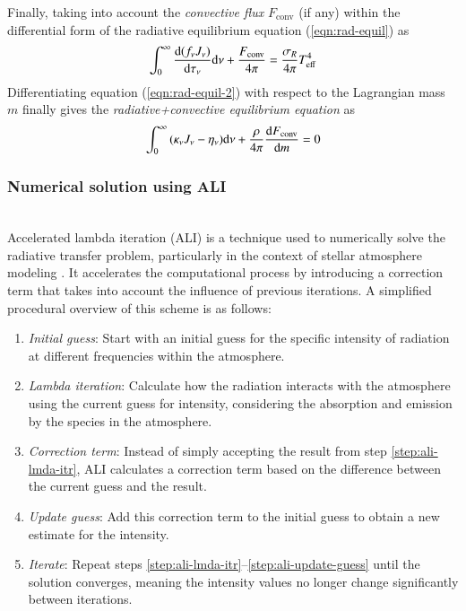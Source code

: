 		Finally, taking into account the \textit{convective flux} $F_\text{conv}$ (if any) within the differential form of the radiative equilibrium equation (\ref{eqn:rad-equil}) as
		\begin{align}
			\int_{0}^{\infty}{\dfrac{\mathrm{d} {(f_\nu J_\nu)}}{\mathrm{d} {\tau_\nu}}\mathrm{d} {\nu}}+\dfrac{F_\text{conv}}{4\pi}=\dfrac{\sigma_R}{4\pi}T_\text{eff}^4 \label{eqn:rad-equil-2}
		\end{align}
		Differentiating equation (\ref{eqn:rad-equil-2}) with respect to the Lagrangian mass $m$ finally gives the \textit{radiative+convective equilibrium equation} as
		\begin{align}
			\int_{0}^{\infty}{(\kappa_\nu J_\nu-\eta_\nu)\mathrm{d} {\nu}}+\dfrac{\rho}{4\pi}\dfrac{\mathrm{d} {F_\text{conv}}}{\mathrm{d} {m}}=0 \label{eqn:rad-conv-equil}
		\end{align}
		
		\subsubsection{Numerical solution using ALI}
		\quad\\
		Accelerated lambda iteration (ALI) is a technique used to numerically solve the radiative transfer problem, particularly in the context of stellar atmosphere modeling \cite{hubeny2003accelerated}. It accelerates the computational process by introducing a correction term that takes into account the influence of previous iterations. A simplified procedural overview of this scheme is as follows:
		\begin{enumerate}
			\item \textit{Initial guess}: Start with an initial guess for the specific intensity of radiation at different frequencies within the atmosphere. \label{step:ali-init-guess}
			\item \textit{Lambda iteration}: Calculate how the radiation interacts with the atmosphere using the current guess for intensity, considering the absorption and emission by the species in the atmosphere. \label{step:ali-lmda-itr}
			\item \textit{Correction term}: Instead of simply accepting the result from step \ref{step:ali-lmda-itr}, ALI calculates a correction term based on the difference between the current guess and the result. \label{step:ali-corr-term}
			\item \textit{Update guess}: Add this correction term to the initial guess to obtain a new estimate for the intensity. \label{step:ali-update-guess}
			\item \textit{Iterate}: Repeat steps \ref{step:ali-lmda-itr}--\ref{step:ali-update-guess} until the solution converges, meaning the intensity values no longer change significantly between iterations. \label{step:ali-iterate}
		\end{enumerate}
		

